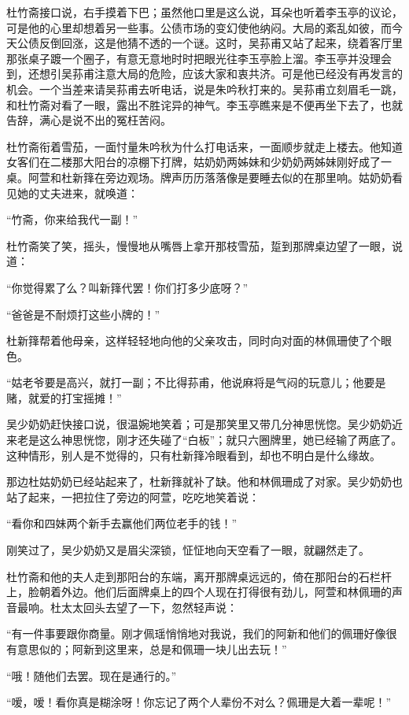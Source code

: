 \par 杜竹斋接口说，右手摸着下巴；虽然他口里是这么说，耳朵也听着李玉亭的议论，可是他的心里却想着另一些事。公债市场的变幻使他纳闷。大局的紊乱如彼，而今天公债反倒回涨，这是他猜不透的一个谜。这时，吴荪甫又站了起来，绕着客厅里那张桌子踱一个圈子，有意无意地时时把眼光往李玉亭脸上溜。李玉亭并没理会到，还想引吴荪甫注意大局的危险，应该大家和衷共济。可是他已经没有再发言的机会。一个当差来请吴荪甫去听电话，说是朱吟秋打来的。吴荪甫立刻眉毛一跳，和杜竹斋对看了一眼，露出不胜诧异的神气。李玉亭瞧来是不便再坐下去了，也就告辞，满心是说不出的冤枉苦闷。
\par 杜竹斋衔着雪茄，一面忖量朱吟秋为什么打电话来，一面顺步就走上楼去。他知道女客们在二楼那大阳台的凉棚下打牌，姑奶奶两姊妹和少奶奶两姊妹刚好成了一桌。阿萱和杜新箨在旁边观场。牌声历历落落像是要睡去似的在那里响。姑奶奶看见她的丈夫进来，就唤道：
\par “竹斋，你来给我代一副！”
\par 杜竹斋笑了笑，摇头，慢慢地从嘴唇上拿开那枝雪茄，踅到那牌桌边望了一眼，说道：
\par “你觉得累了么？叫新箨代罢！你们打多少底呀？”
\par “爸爸是不耐烦打这些小牌的！”
\par 杜新箨帮着他母亲，这样轻轻地向他的父亲攻击，同时向对面的林佩珊使了个眼色。
\par “姑老爷要是高兴，就打一副；不比得荪甫，他说麻将是气闷的玩意儿；他要是赌，就爱的打宝摇摊！”
\par 吴少奶奶赶快接口说，很温婉地笑着；可是那笑里又带几分神思恍惚。吴少奶奶近来老是这么神思恍惚，刚才还失碰了“白板”；就只六圈牌里，她已经输了两底了。这种情形，别人是不觉得的，只有杜新箨冷眼看到，却也不明白是什么缘故。
\par 那边杜姑奶奶已经站起来了，杜新箨就补了缺。他和林佩珊成了对家。吴少奶奶也站了起来，一把拉住了旁边的阿萱，吃吃地笑着说：
\par “看你和四妹两个新手去赢他们两位老手的钱！”
\par 刚笑过了，吴少奶奶又是眉尖深锁，怔怔地向天空看了一眼，就翩然走了。
\par 杜竹斋和他的夫人走到那阳台的东端，离开那牌桌远远的，倚在那阳台的石栏杆上，脸朝着外边。他们后面牌桌上的四个人现在打得很有劲儿，阿萱和林佩珊的声音最响。杜太太回头去望了一下，忽然轻声说：
\par “有一件事要跟你商量。刚才佩瑶悄悄地对我说，我们的阿新和他们的佩珊好像很有意思似的；阿新到这里来，总是和佩珊一块儿出去玩！”
\par “哦！随他们去罢。现在是通行的。”
\par “嗳，嗳！看你真是糊涂呀！你忘记了两个人辈份不对么？佩珊是大着一辈呢！”
